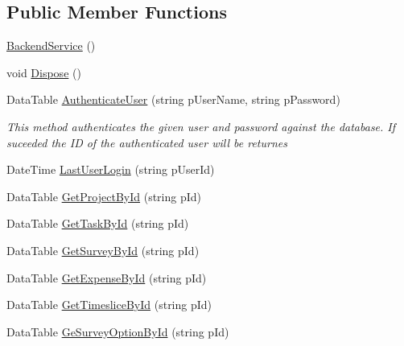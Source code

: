 \subsection*{Public Member Functions}
\begin{DoxyCompactItemize}
\item 
\hyperlink{class_plex_byte_1_1_mo_cap_1_1_backend_1_1_backend_service_a6515e3116617dbf054be2f26cd7b2e38}{Backend\+Service} ()
\item 
void \hyperlink{class_plex_byte_1_1_mo_cap_1_1_backend_1_1_backend_service_a7859887daa5e4bb760dedcbcc6fb7bf1}{Dispose} ()
\item 
Data\+Table \hyperlink{class_plex_byte_1_1_mo_cap_1_1_backend_1_1_backend_service_a1d64ef21282345f37aa3f42cba3656d2}{Authenticate\+User} (string p\+User\+Name, string p\+Password)
\begin{DoxyCompactList}\small\item\em This method authenticates the given user and password against the database. If suceeded the ID of the authenticated user will be returnes \end{DoxyCompactList}\item 
Date\+Time \hyperlink{class_plex_byte_1_1_mo_cap_1_1_backend_1_1_backend_service_ada231807a0c0116efff3a13c8d7fed3b}{Last\+User\+Login} (string p\+User\+Id)
\item 
Data\+Table \hyperlink{class_plex_byte_1_1_mo_cap_1_1_backend_1_1_backend_service_abe9eb812c39fcf5b1dd130ad3b0878b9}{Get\+Project\+By\+Id} (string p\+Id)
\item 
Data\+Table \hyperlink{class_plex_byte_1_1_mo_cap_1_1_backend_1_1_backend_service_ade6c8104facb7205953d0386b4119298}{Get\+Task\+By\+Id} (string p\+Id)
\item 
Data\+Table \hyperlink{class_plex_byte_1_1_mo_cap_1_1_backend_1_1_backend_service_a28c34c1d41ab5cc143ccfd5012481dfd}{Get\+Survey\+By\+Id} (string p\+Id)
\item 
Data\+Table \hyperlink{class_plex_byte_1_1_mo_cap_1_1_backend_1_1_backend_service_ae6b7cdf41f348ce844dfa08a876495c8}{Get\+Expense\+By\+Id} (string p\+Id)
\item 
Data\+Table \hyperlink{class_plex_byte_1_1_mo_cap_1_1_backend_1_1_backend_service_a01c6f0ba7587e8629b9ede895313ff76}{Get\+Timeslice\+By\+Id} (string p\+Id)
\item 
Data\+Table \hyperlink{class_plex_byte_1_1_mo_cap_1_1_backend_1_1_backend_service_aafab3576b46106ef63b5cc279e2f64bb}{Ge\+Survey\+Option\+By\+Id} (string p\+Id)
\item 

\end{DoxyCompactItemize}
